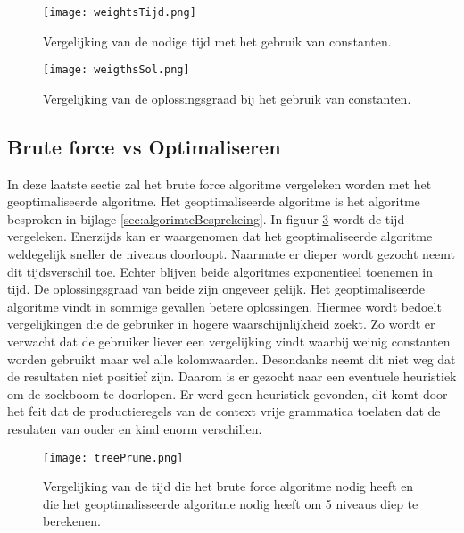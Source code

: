 \documentclass[Main.tex]{subfiles}
\begin{document}
\begin{figure}[!htb]
\centering
\texttt{[image: weightsTijd.png]} %
\caption{Vergelijking van de nodige tijd met het gebruik van constanten.} \label{fig:gewichtenTijd}
\end{figure}

\begin{figure}[!htb]
\centering
\texttt{[image: weigthsSol.png]} %
\caption{Vergelijking van de oplossingsgraad bij het gebruik van constanten.} \label{fig:gewichtenOplossingsgraad}
\end{figure}

\subsection{Brute force vs Optimaliseren}
In deze laatste sectie zal het brute force algoritme vergeleken worden met het geoptimaliseerde algoritme. Het geoptimaliseerde algoritme is het algoritme besproken in bijlage \ref{sec:algorimteBesprekeing}. In figuur \ref{fig:brutevsopttijd} wordt de tijd vergeleken. Enerzijds kan er waargenomen dat het geoptimaliseerde algoritme weldegelijk sneller de niveaus doorloopt. Naarmate er dieper wordt gezocht neemt dit tijdsverschil toe. Echter blijven beide algoritmes exponentieel toenemen in tijd. De oplossingsgraad van beide zijn ongeveer gelijk. Het geoptimaliseerde algoritme vindt in sommige gevallen betere oplossingen. Hiermee wordt bedoelt vergelijkingen die de gebruiker in hogere waarschijnlijkheid zoekt. Zo wordt er verwacht dat de gebruiker liever een vergelijking vindt waarbij weinig constanten worden gebruikt maar wel alle kolomwaarden. Desondanks neemt dit niet weg dat de resultaten niet positief zijn. Daarom is er gezocht naar een eventuele heuristiek om de zoekboom te doorlopen. Er werd geen heuristiek gevonden, dit komt door het feit dat de productieregels van de context vrije grammatica toelaten dat de resulaten van ouder en kind enorm verschillen.


\begin{figure}[!htb]
\centering
\texttt{[image: treePrune.png]} %
\caption{Vergelijking van de tijd die het brute force algoritme nodig heeft en die het geoptimalisseerde algoritme nodig heeft om 5 niveaus diep te berekenen.} \label{fig:brutevsopttijd}
\end{figure}
\end{document}
